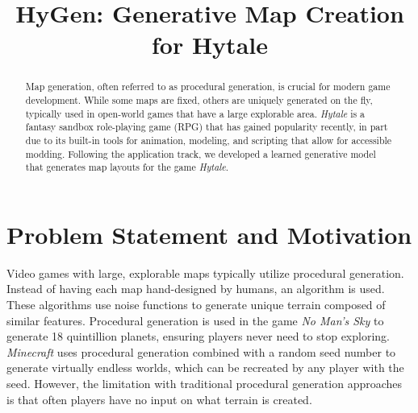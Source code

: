 \documentclass[conference]{IEEEtran}
\begin{document}
\title{HyGen: Generative Map Creation for Hytale\\
}

\author{
\and
{}
\and
{}
}

\maketitle

\begin{abstract}
Map generation, often referred to as procedural generation, is crucial for modern game development. While some maps are fixed, others are uniquely generated on the fly, typically used in open-world games that have a large explorable area. \textit{Hytale} is a fantasy sandbox role-playing game (RPG) that has gained popularity recently, in part due to its built-in tools for animation, modeling, and scripting that allow for accessible modding. Following the application track, we developed a learned generative model that generates map layouts for the game \textit{Hytale}.
\end{abstract}



\section{Problem Statement and Motivation}

Video games with large, explorable maps typically utilize procedural generation. Instead of having each map hand-designed by humans, an algorithm is used. These algorithms use noise functions to generate unique terrain composed of similar features. Procedural generation is used in the game \textit{No Man's Sky} to generate 18 quintillion planets, ensuring players never need to stop exploring. \textit{Minecraft} uses procedural generation combined with a random seed number to generate virtually endless worlds, which can be recreated by any player with the seed. However, the limitation with traditional procedural generation approaches is that often players have no input on what terrain is created. 
\end{document}
